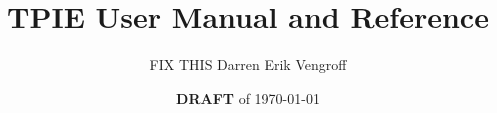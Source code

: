 


\setlength{\topmargin}{-.5in}   
\setlength{\oddsidemargin}{.1in} %
\setlength{\evensidemargin}{.1in} %
\setlength{\textwidth}{6.3in}
\setlength{\textheight}{9in}


\makeindex






\newcommand{\edition}{0.7.1}
\newcommand{\version}{0.7.1a}

\newcommand{\gxxversion}{2.7.0}









\title{TPIE User Manual and Reference}
\author{FIX THIS Darren Erik Vengroff}
\date{{\bf DRAFT} of \today}

\maketitle

